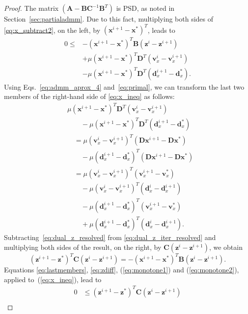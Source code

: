 \documentclass[10pt,twocolumn,twoside]{IEEEtran}
\newcommand{\x}{\mathbf{x}} %
\newcommand{\z}{\mathbf{z}} %
\newcommand{\vs}{\mathbf{v}} %
\newcommand{\dv}{\mathbf{d}} %
\newcommand{\D}{\mathbf{D}} %
\newcommand{\A}{\mathbf{A}} %
\newcommand{\B}{\mathbf{B}} %
\newcommand{\C}{\mathbf{C}} %
\begin{document}
\begin{proof}
	The matrix $( \A - \B \C^{-1} \B^T )$ is PSD, as noted in Section~\ref{sec:partialadmm}. Due to this fact, multiplying both sides of \eqref{eq:x_subtract2}, on the left, by $(\x^{i+1} - \x^*)^T$, leads to
	\begin{equation} \label{eq:x_ineq}
	\begin{aligned}
	0 \leq &-(\x^{i+1} - \x^*)^T \B (\z^i - \z^{i+1}) \\
	& + \mu (\x^{i+1} - \x^*)^T \D^T (\vs_x^i - \vs_x^{i+1})\\
	& - \mu (\x^{i+1} - \x^*)^T \D^T (\dv_x^{i+1} - \dv_x^*).
	\end{aligned}
	\end{equation}
	Using Eqs.~\eqref{eq:admm_aprox_4} and~\eqref{eq:primal}, we can transform the last two members of the right-hand side of \eqref{eq:x_ineq} as follows:
	\begin{equation} \label{eq:lastmembers}
	\begin{aligned}
	&\mu (\x^{i+1} - \x^*)^T \D^T (\vs_x^i - \vs_x^{i+1}) \\
	& \qquad - \mu (\x^{i+1} - \x^*)^T \D^T (\dv_x^{i+1} - \dv_x^*) \\
	& \quad = \mu (\vs_x^i - \vs_x^{i+1})^T (\D\x^{i+1} - \D\x^*)\\
	& \qquad - \mu (\dv_x^{i+1} - \dv_x^*)^T (\D\x^{i+1} - \D\x^*) \\
	& \quad = \mu (\vs_x^i - \vs_x^{i+1})^T (\vs_x^{i+1} - \vs_x^*) \\ 
	& \qquad - \mu (\vs_x^i - \vs_x^{i+1})^T (\dv_x^i - \dv_x^{i+1}) \\
	& \qquad- \mu (\dv_x^{i+1} - \dv_x^*)^T (\vs_x^{i+1} - \vs_x^*) \\
	& \qquad + \mu (\dv_x^{i+1} - \dv_x^*)^T (\dv_x^i - \dv_x^{i+1}).
	\end{aligned}
	\end{equation}
	Subtracting~\eqref{eq:dual_z_resolved} from \eqref{eq:dual_z_iter_resolved} and multiplying both sides of the result, on the right, by $\C (\z^i - \z^{i+1})$, we obtain
	\begin{equation} \label{eq:zdiff}
	(\z^{i+1} - \z^*)^T \C (\z^i - \z^{i+1}) = -(\x^{i+1} - \x^*)^T \B (\z^i - \z^{i+1}).
	\end{equation}
	Equations \eqref{eq:lastmembers}, \eqref{eq:zdiff}, (\ref{eq:monotone1}) and (\ref{eq:monotone2}), applied to~(\ref{eq:x_ineq}), lead to
	\begin{equation} \label{eq:x_ineq2}
	\begin{aligned}
	0 & \leq (\z^{i+1} - \z^*)^T \C (\z^i - \z^{i+1}) \\		

\end{aligned}
\end{equation}
\end{proof}
\end{document}
